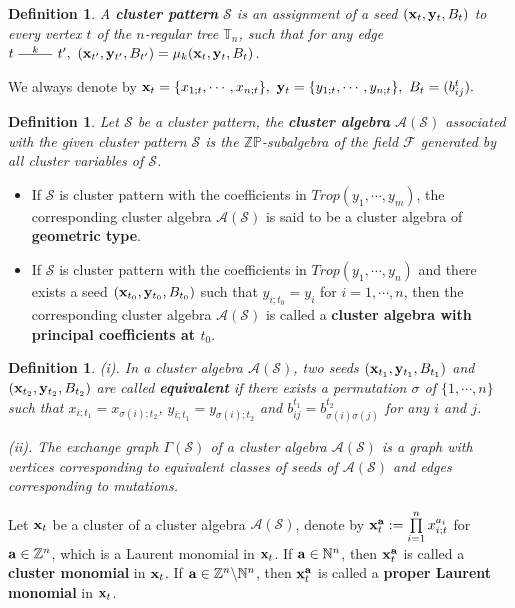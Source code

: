 \documentclass[14pt]{amsart}
\newtheorem{Definition}[Theorem]{Definition}
\begin{document}
\begin{Definition}\label{defcpattern}
  A {\bf cluster pattern} $\mathcal S$ is an assignment of a  seed  $({\bf x}_t,{\bf y}_t,B_t)$ to every vertex $t$ of the $n$-regular tree $\mathbb T_n$, such that for any edge $t^{~\underline{\quad k \quad}}~ t^{\prime},~({\bf x}_{t^{\prime}},{\bf y}_{t^{\prime}},B_{t^{\prime}})=\mu_k({\bf x}_t,{\bf y}_t,B_t)$.
\end{Definition}
We always denote by ${\bf x}_t=\{x_{1;t},\cdots, x_{n;t}\},~ {\bf y}_t=\{y_{1;t},\cdots, y_{n;t}\}, ~B_t=(b_{ij}^t).$
\begin{Definition} Let  $\mathcal S$ be a cluster pattern,   the {\bf cluster algebra} $\mathcal A(\mathcal S)$  associated with the given cluster pattern $\mathcal S$ is the $\mathbb {ZP}$-subalgebra of the field $\mathcal F$ generated by all cluster variables of  $\mathcal S$.
 \end{Definition}
 \begin{itemize}
 \item If  $\mathcal S$ is cluster pattern with the coefficients in $Trop(y_1,\cdots,y_m)$, the corresponding cluster algebra $\mathcal A(\mathcal S)$ is said to be a cluster algebra of {\bf geometric type}.
 \item If  $\mathcal S$ is cluster pattern  with the coefficients in $Trop(y_1,\cdots,y_n)$ and there exists a seed $({\bf x}_{t_0},{\bf y}_{t_0},B_{t_0})$ such that $y_{i;t_0}=y_i$ for $i=1,\cdots,n$, then  the corresponding cluster algebra  $\mathcal A(\mathcal S)$ is called a {\bf cluster algebra with principal coefficients at $t_0$}.
\end{itemize}
\begin{Definition}
(i). In  a cluster algebra $\mathcal A(\mathcal S)$, two seeds $({\bf x}_{t_1},{\bf y}_{t_1},B_{t_1})$ and  $({\bf x}_{t_2},{\bf y}_{t_2},B_{t_2})$ are called {\bf equivalent} if there exists a permutation $\sigma$ of $\{1,\cdots,n\}$ such that $x_{i;t_1}=x_{\sigma(i);t_2}$, $y_{i;t_1}=y_{\sigma(i);t_2}$ and $b_{ij}^{t_1}=b_{\sigma(i)\sigma(j)}^{t_2}$ for any $i$ and $j$.


(ii). The exchange graph $\Gamma(\mathcal S)$ of a cluster algebra $\mathcal A(\mathcal S)$ is a graph with vertices corresponding to equivalent classes of seeds of  $\mathcal A(\mathcal S)$ and edges corresponding to mutations.
\end{Definition}

Let ${\bf x}_t$ be a cluster of a cluster algebra $\mathcal A(\mathcal S)$, denote by ${\bf x}_t^{\bf a}:=\prod\limits_{i=1}^nx_{i;t}^{a_i}$ for ${\bf a}\in \mathbb Z^n$, which is a Laurent monomial in ${\bf x}_t$. If ${\bf a}\in\mathbb N^n$, then ${\bf x}_t^{\bf a}$ is called a {\bf cluster monomial} in ${\bf x}_t$. If ${\bf a}\in \mathbb Z^n\backslash \mathbb N^n$, then ${\bf x}_t^{\bf a}$ is called a {\bf proper Laurent monomial} in ${\bf x}_t$.
\end{document}
